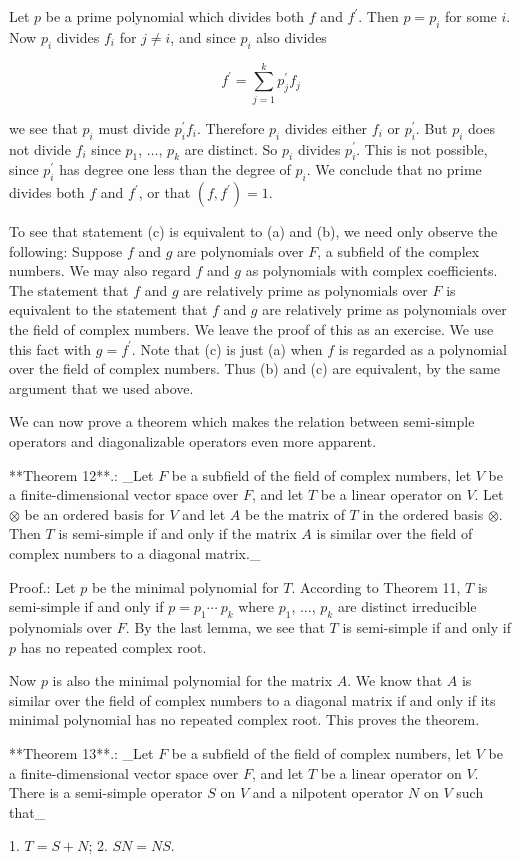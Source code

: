 Let \(p\) be a prime polynomial which divides both \(f\) and \(f^{\prime}\). Then \(p=p_{i}\) for some \(i\). Now \(p_{i}\) divides \(f_{i}\) for \(j\neq i\), and since \(p_{i}\) also divides

\[f^{\prime}=\sum_{j=1}^{k}p_{j}^{\prime}f_{j}\]

we see that \(p_{i}\) must divide \(p_{i}^{\prime}f_{i}\). Therefore \(p_{i}\) divides either \(f_{i}\) or \(p_{i}^{\prime}\). But \(p_{i}\) does not divide \(f_{i}\) since \(p_{1}\), \(\ldots\), \(p_{k}\) are distinct. So \(p_{i}\) divides \(p_{i}^{\prime}\). This is not possible, since \(p_{i}^{\prime}\) has degree one less than the degree of \(p_{i}\). We conclude that no prime divides both \(f\) and \(f^{\prime}\), or that \((f,f^{\prime})=1\).

To see that statement (c) is equivalent to (a) and (b), we need only observe the following: Suppose \(f\) and \(g\) are polynomials over \(F\), a subfield of the complex numbers. We may also regard \(f\) and \(g\) as polynomials with complex coefficients. The statement that \(f\) and \(g\) are relatively prime as polynomials over \(F\) is equivalent to the statement that \(f\) and \(g\) are relatively prime as polynomials over the field of complex numbers. We leave the proof of this as an exercise. We use this fact with \(g=f^{\prime}\). Note that (c) is just (a) when \(f\) is regarded as a polynomial over the field of complex numbers. Thus (b) and (c) are equivalent, by the same argument that we used above.

We can now prove a theorem which makes the relation between semi-simple operators and diagonalizable operators even more apparent.

**Theorem 12**.: _Let \(F\) be a subfield of the field of complex numbers, let \(V\) be a finite-dimensional vector space over \(F\), and let \(T\) be a linear operator on \(V\). Let \(\otimes\) be an ordered basis for \(V\) and let \(A\) be the matrix of \(T\) in the ordered basis \(\otimes\). Then \(T\) is semi-simple if and only if the matrix \(A\) is similar over the field of complex numbers to a diagonal matrix._

Proof.: Let \(p\) be the minimal polynomial for \(T\). According to Theorem 11, \(T\) is semi-simple if and only if \(p=p_{1}\cdots\ p_{k}\) where \(p_{1}\), \(\ldots\), \(p_{k}\) are distinct irreducible polynomials over \(F\). By the last lemma, we see that \(T\) is semi-simple if and only if \(p\) has no repeated complex root.

Now \(p\) is also the minimal polynomial for the matrix \(A\). We know that \(A\) is similar over the field of complex numbers to a diagonal matrix if and only if its minimal polynomial has no repeated complex root. This proves the theorem.

**Theorem 13**.: _Let \(F\) be a subfield of the field of complex numbers, let \(V\) be a finite-dimensional vector space over \(F\), and let \(T\) be a linear operator on \(V\). There is a semi-simple operator \(S\) on \(V\) and a nilpotent operator \(N\) on \(V\) such that_

1. \(T=S+N\);
2. \(SN=NS\).

 